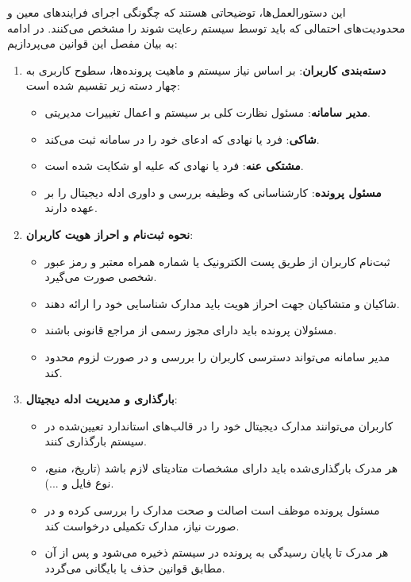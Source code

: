 \documentclass[12pt,a4paper,oneside]{article}
\begin{document}
این دستورالعمل‌ها، توضیحاتی هستند که چگونگی اجرای فرایندهای معین و محدودیت‌های احتمالی که باید توسط سیستم رعایت شوند را مشخص می‌کنند. در ادامه به بیان مفصل این قوانین می‌پردازیم:

\begin{enumerate}
    \item \textbf{دسته‌بندی کاربران}: بر اساس نیاز سیستم و ماهیت پرونده‌ها، سطوح کاربری به چهار دسته زیر تقسیم شده است:
    \begin{itemize}
        \item \textbf{مدیر سامانه}: مسئول نظارت کلی بر سیستم و اعمال تغییرات مدیریتی.
        \item \textbf{شاکی}: فرد یا نهادی که ادعای خود را در سامانه ثبت می‌کند.
        \item \textbf{مشتکی عنه}: فرد یا نهادی که علیه او شکایت شده است.
        \item \textbf{مسئول پرونده}: کارشناسانی که وظیفه بررسی و داوری ادله دیجیتال را بر عهده دارند.
    \end{itemize}

    \item \textbf{نحوه ثبت‌نام و احراز هویت کاربران}:
    \begin{itemize}
        \item ثبت‌نام کاربران از طریق پست الکترونیک یا شماره همراه معتبر و رمز عبور شخصی صورت می‌گیرد.
        \item شاکیان و متشاکیان جهت احراز هویت باید مدارک شناسایی خود را ارائه دهند.
        \item مسئولان پرونده باید دارای مجوز رسمی از مراجع قانونی باشند.
        \item مدیر سامانه می‌تواند دسترسی کاربران را بررسی و در صورت لزوم محدود کند.
    \end{itemize}

    \item \textbf{بارگذاری و مدیریت ادله دیجیتال}:
    \begin{itemize}
        \item کاربران می‌توانند مدارک دیجیتال خود را در قالب‌های استاندارد تعیین‌شده در سیستم بارگذاری کنند.
        \item هر مدرک بارگذاری‌شده باید دارای مشخصات متادیتای لازم باشد (تاریخ، منبع، نوع فایل و ...).
        \item مسئول پرونده موظف است اصالت و صحت مدارک را بررسی کرده و در صورت نیاز، مدارک تکمیلی درخواست کند.
        \item هر مدرک تا پایان رسیدگی به پرونده در سیستم ذخیره می‌شود و پس از آن مطابق قوانین حذف یا بایگانی می‌گردد.
    \end{itemize}


\end{enumerate}
\end{document}
